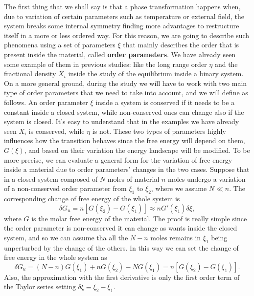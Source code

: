 The first thing that we shall say is that a phase transformation happens when, due to variation of certain parameters such as temperature or external field, the system breaks some internal symmetry finding more advantages to restructure itself in a more or less ordered way. For this reason, we are going to describe such phenomena using a set of parameters $\xi$ that mainly describes the order that is present inside the material, called \textbf{order parameters}. We have already seen some example of them in previous studies: like the long range order $\eta$ and the fractional density $X_i$ inside the study of the equilibrium inside a binary system. On a more general ground, during the study we will have to work with two main type of order parameters that we need to take into account, and we will define as follows.
{
    An order parameter $\xi$ inside a system is conserved if it needs to be a constant inside a closed system, while non-conserved ones can change also if the system is closed.
}
\noindent
It's easy to understand that in the examples we have already seen $X_i$ is conserved, while $\eta$ is not. These two types of parameters highly influences how the transition behaves since the free energy will depend on them, $G(\xi)$, and based on their variation the energy landscape will be modified. To be more precise, we can evaluate a general form for the variation of free energy inside a material due to order parameters' changes in the two cases.
{
    Suppose that in a closed system composed of $N$ moles of material $n$ moles undergo a variation of a non-conserved order parameter from $\xi_1$ to $\xi_2$, where we assume $N\ll n$. The corresponding change of free energy of the whole system is
    \begin{equation}
        \delta G_u = n[G(\xi_2) - G(\xi_1)] \approx n G'(\xi_1)\delta\xi,
    \end{equation}
    where $G$ is the molar free energy of the material.
}
{
    The proof is really simple since the order parameter is non-conserved it can change as wants inside the closed system, and so we can assume tha all the $N-n$ moles remains in $\xi_1$ being unperturbed by the change of the others. In this way we can set the change of free energy in the whole system as
    \begin{equation}
        \delta G_u = (N-n)G(\xi_1) + nG(\xi_2) - NG(\xi_1) = n[G(\xi_2) - G(\xi_1)].
    \end{equation}
    Also, the approximation with the first derivative is only the first order term of the Taylor series setting $\delta\xi \equiv \xi_2 - \xi_1$. 
}
